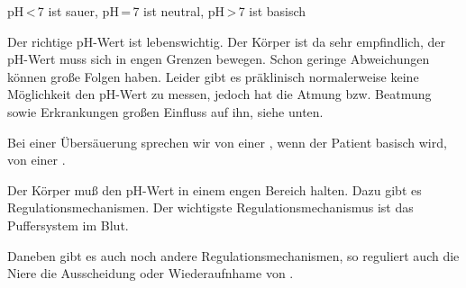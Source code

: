 {



pH\,{\textless}\,7 ist sauer, pH\,=\,7 ist neutral,
pH\,{\textgreater}\,7 ist basisch


Der richtige pH-Wert ist lebenswichtig. Der Körper ist da sehr empfindlich, der
pH-Wert muss sich in engen Grenzen bewegen. Schon geringe
Abweichungen können große Folgen haben. Leider gibt es präklinisch normalerweise keine Möglichkeit
den pH-Wert zu messen, jedoch hat die Atmung bzw. Beatmung sowie Erkrankungen
 großen Einfluss auf ihn, siehe unten.

Bei einer Übersäuerung sprechen wir von einer
, wenn der Patient basisch wird, 
von einer .
}{}{}{}{}

{
Der Körper muß den pH-Wert in einem engen Bereich halten. Dazu gibt es
Regulationsmechanismen. Der wichtigste Regulationsmechanismus ist das
Puffersystem im Blut.~

Daneben gibt es auch noch andere Regulationsmechanismen, so reguliert auch die
Niere die Ausscheidung oder Wiederaufnhame von .

}{}{}{}{}

